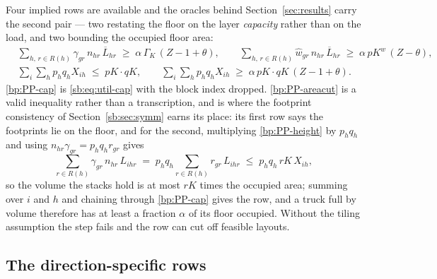 Four implied rows are available and the oracles behind
Section~\ref{sec:results} carry the second pair --- two restating the
floor on the layer \emph{capacity} rather than on the load, and two
bounding the occupied floor area:
\begin{align}
  & \sum_{h,\,r \in R(h)} \gamma_{gr}\,n_{hr}\,\overline{L}_{hr}
      \;\ge\;\alpha\,\Gamma_{K}\,(Z-1+\theta), \qquad
    \sum_{h,\,r \in R(h)} \hat w_{gr}\,n_{hr}\,\overline{L}_{hr}
      \;\ge\;\alpha\,\mathit{pK}^{w}\,(Z-\theta),
    \label{bp:PP-cap}\\
  & \sum_{i}\sum_{h} p_{h}q_{h}X_{ih} \;\le\; \mathit{pK}\cdot\mathit{qK},
    \qquad
    \sum_{i}\sum_{h} p_{h}q_{h}X_{ih}
      \;\ge\;\alpha\,\mathit{pK}\cdot\mathit{qK}\,(Z-1+\theta).
    \label{bp:PP-areacut}
\end{align}
\eqref{bp:PP-cap} is \eqref{sb:eq:util-cap} with the block index
dropped. \eqref{bp:PP-areacut} is a valid inequality rather than a
transcription, and is where the footprint consistency of
Section~\ref{sb:sec:symm} earns its place: its first row says the
footprints lie on the floor, and for the second, multiplying
\eqref{bp:PP-height} by $p_{h}q_{h}$ and using
$n_{hr}\gamma_{gr}=p_{h}q_{h}r_{gr}$ gives
\[
  \sum_{r\in R(h)} \gamma_{gr}\,n_{hr}\,L_{ihr}
  \;=\;p_{h}q_{h}\sum_{r\in R(h)} r_{gr}\,L_{ihr}
  \;\le\;p_{h}q_{h}\,\mathit{rK}\,X_{ih},
\]
so the volume the stacks hold is at most $\mathit{rK}$ times the
occupied area; summing over $i$ and $h$ and chaining through
\eqref{bp:PP-cap} gives the row, and a truck full by volume therefore
has at least a fraction $\alpha$ of its floor occupied. Without the
tiling assumption the step fails and the row can cut off feasible
layouts.

\subsection{The direction-specific rows}
\label{sec:pp-dir}

